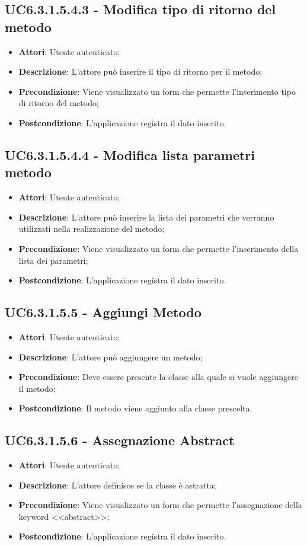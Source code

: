 \subsection{UC6.3.1.5.4.3 - Modifica tipo di ritorno del metodo} 
\label{ssec:UC6.3.1.5.4.3} 
\begin{itemize} 
\item \textbf{Attori}: Utente autenticato;
\item \textbf{Descrizione}: L'attore può inserire il tipo di ritorno per il metodo;
\item \textbf{Precondizione}: Viene visualizzato un form che permette l'inserimento tipo di ritorno del metodo;
\item \textbf{Postcondizione}: L'applicazione registra il dato inserito.
\end{itemize} 
\subsection{UC6.3.1.5.4.4 - Modifica lista parametri metodo} 
\label{ssec:UC6.3.1.5.4.4} 
\begin{itemize} 
\item \textbf{Attori}: Utente autenticato;
\item \textbf{Descrizione}: L'attore può inserire la lista dei parametri che verranno utilizzati nella realizzazione del metodo;
\item \textbf{Precondizione}: Viene visualizzato un form che permette l'inserimento della lista dei parametri;
\item \textbf{Postcondizione}: L'applicazione registra il dato inserito.
\end{itemize} 
\subsection{UC6.3.1.5.5 - Aggiungi Metodo} 
\label{ssec:UC6.3.1.5.5} 
\begin{itemize} 
\item \textbf{Attori}: Utente autenticato;
\item \textbf{Descrizione}: L'attore può aggiungere un metodo;
\item \textbf{Precondizione}: Deve essere presente la classe alla quale si vuole aggiungere il metodo;
\item \textbf{Postcondizione}: Il metodo viene aggiunto alla classe prescelta.
\end{itemize} 
\subsection{UC6.3.1.5.6 - Assegnazione Abstract} 
\label{ssec:UC6.3.1.5.6} 
\begin{itemize} 
\item \textbf{Attori}: Utente autenticato;
\item \textbf{Descrizione}: L'attore definisce se la classe è astratta;
\item \textbf{Precondizione}: Viene visualizzato un form che permette l'assegnazione della keyword <<abstract>>;
\item \textbf{Postcondizione}: L'applicazione registra il dato inserito.
\end{itemize} 
